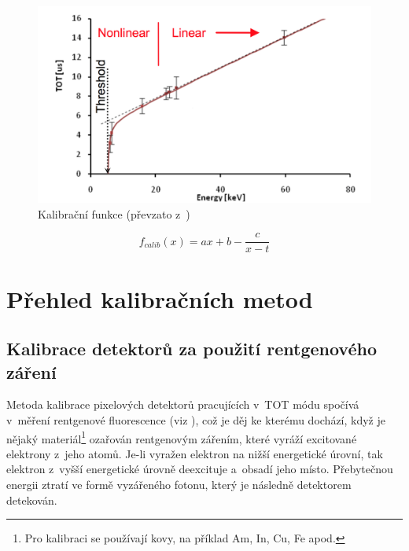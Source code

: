 \begin{figure}[th!]
	\begin{center}
		\includegraphics[width=13cm]{figures/calib_function.png}
		\caption{Kalibrační funkce (převzato z~\cite{Jakubek2011S262})}
		\label{fig:calib:calib_function}
	\end{center}
\end{figure}


\begin{equation}\label{eq:calib:calib_function}
	f_{calib}(x) = ax + b - \frac{c}{x-t}
\end{equation}

\section{Přehled kalibračních metod}

\subsection{Kalibrace detektorů za použití rentgenového záření}\label{calib:xray}
Metoda kalibrace pixelových detektorů pracujících v~TOT módu \cite{Jakubek2011S262} spočívá v~měření rentgenové fluorescence (viz \cite{Jakubek-radiography_and_charge_sharing}),
což je děj ke kterému dochází, když je nějaký materiál\footnote{Pro kalibraci se používají kovy, na příklad Am, In, Cu, Fe apod.}
ozařován rentgenovým zářením, které vyráží excitované elektrony z~jeho atomů. Je-li vyražen elektron na nižší energetické úrovní, tak elektron z~vyšší energetické úrovně deexcituje a~obsadí jeho místo. Přebytečnou energii ztratí ve formě vyzářeného fotonu, který je následně detektorem detekován. 

